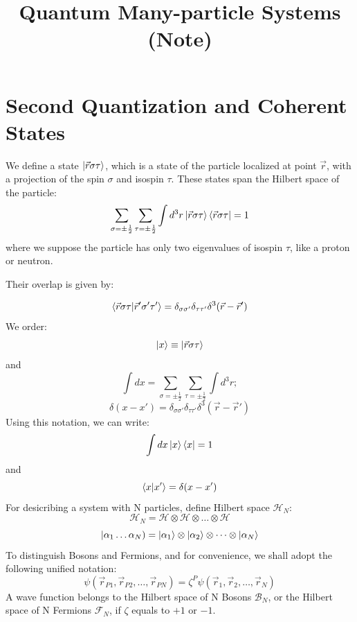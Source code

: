 \documentclass[12pt]{article}
\title{Quantum Many-particle Systems (Note)}
\begin{document}
\maketitle
\section{Second Quantization and Coherent States}

We define a state $\ket{\vec{r}\sigma\tau}$, which is a state of the particle 
localized at point $\vec{r}$, with a projection of the spin $\sigma$ 
and isospin $\tau$. These states span the Hilbert space of the particle:
\begin{equation*}
    \sum_{\sigma=\pm\frac{1}{2}}\sum_{\tau=\pm\frac{1}{2}}
    \int d^3r\ket{\vec{r}\sigma\tau}\bra{\vec{r}\sigma\tau}=1
\end{equation*} 
where we suppose the particle has only two eigenvalues of isospin $\tau$, 
like a proton or neutron.

Their overlap is given by:

\begin{equation*}
    \bra{\vec{r}\sigma\tau}\ket{\vec{r}'\sigma'\tau'}=\delta_{\sigma\sigma'}
    \delta_{\tau\tau'}\delta^3(\vec{r}-\vec{r}')
\end{equation*}
We order:
\begin{equation*}
    \ket{x}\equiv\ket{\vec{r}\sigma\tau}
\end{equation*}
and
\begin{equation*}
    \int dx=\sum_{\sigma=\pm\frac{1}{2}}\sum_{\tau=\pm\frac{1}{2}}\int d^3r;
\end{equation*}
\begin{equation*}
    \delta(x-x')=\delta_{\sigma\sigma'}\delta_{\tau\tau'}
    \delta^3(\vec{r}-\vec{r}')
\end{equation*}
Using this notation, we can write:
\begin{equation*}
    \int dx\ket{x}\bra{x}=1
\end{equation*}
and
\begin{equation*}
    \bra{x}\ket{x'}=\delta(x-x')
\end{equation*}
For desicribing a system with N particles, define Hilbert space $\mathcal{H}_N$:
\begin{equation*}
    \mathcal{H}_N=\mathcal{H}\otimes\mathcal{H}\otimes\dots\otimes\mathcal{H}
\end{equation*}
\begin{equation*}
    |\alpha_1\dots\alpha_N)=\ket{\alpha_1}\otimes\ket{\alpha_2}\otimes\dots
    \otimes\ket{\alpha_N}
\end{equation*}
To distinguish Bosons and Fermions, and for convenience, we shall adopt the following
unified notation:
\begin{equation*}
    \psi(\vec{r}_{P1},\vec{r}_{P2},\dots,\vec{r}_{PN})
    =\zeta^P\psi(\vec{r}_1,\vec{r}_2,\dots,\vec{r}_N)
\end{equation*}
A wave function belongs to the Hilbert space of N Bosons $\mathcal{B}_N$, or the 
Hilbert space of N Fermions $\mathcal{F}_N$, if $\zeta$ equals to $+1$ or $-1$.
\end{document}
